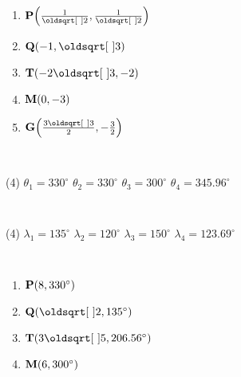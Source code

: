 \documentclass[12pt]{article} %
\begin{document}
\begin{qstn}\texttt{  }
  \begin{enumerate}[label=(\alph*)]
    \item $ \vb P\left( \frac{1}{\sqrt{2}}, \frac{1}{\sqrt{2}} \right)$
    \item $ \vb Q\left( -1, \sqrt{3}  \right) $
    \item $ \vb T\left( -2\sqrt{3} , -2 \right)$
    \item $ \vb M\left( 0,-3  \right) $
    \item $ \vb G\left( \frac{3\sqrt{3}}{2} ,-\frac{3}{2}  \right) $
  \end{enumerate}
\end{qstn}

\newpage

\begin{qstn} \texttt{  }
    \begin{tasks}(4)
       \task $\theta_1 = 330^{\circ}$
       \task $\theta_2 = 330^{\circ}$
       \task $\theta_3 = 300^{\circ}$
       \task $\theta_4 = 345.96^{\circ}$
    \end{tasks}
\end{qstn}

\begin{qstn} \texttt{  }
    \begin{tasks}(4)
       \task $\lambda_1 = 135^{\circ}$
       \task $\lambda_2 = 120^{\circ}$
       \task $\lambda_3 = 150^{\circ}$
       \task $\lambda_4 = 123.69^{\circ}$
    \end{tasks}
\end{qstn}

\begin{qstn}\texttt{  }
  \begin{enumerate}[label=(\alph*)]
    \item $ \vb P\left( 8, 330^{\circ}\right)$
    \item $ \vb Q\left( \sqrt{2} , 135^{\circ} \right) $
    \item $ \vb T\left( 3\sqrt{5} , 206.56^{\circ} \right)$
    \item $ \vb M\left( 6, 300^{\circ} \right) $
  \end{enumerate}
\end{qstn}

\newpage
\end{document}
